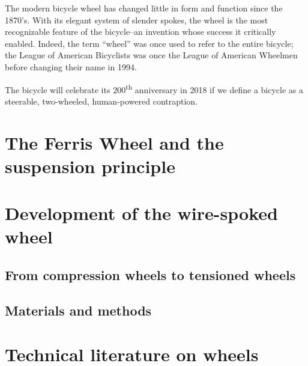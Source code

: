\documentclass[../thesis.tex]{subfiles}
\begin{document}
The modern bicycle wheel has changed little in form and function since the 1870's. With its elegant system of slender spokes, the wheel is the most recognizable feature of the bicycle--an invention whose success it critically enabled. Indeed, the term ``wheel'' was once used to refer to the entire bicycle; the League of American Bicyclists was once the League of American Wheelmen before changing their name in 1994.

The bicycle will celebrate its 200\textsuperscript{th} anniversary in 2018 if we define a bicycle as a steerable, two-wheeled, human-powered contraption. 

\section{The Ferris Wheel and the suspension principle}

\section{Development of the wire-spoked wheel}
\subsection{From compression wheels to tensioned wheels}
\subsection{Materials and methods}

\section{Technical literature on wheels}
\end{document}
